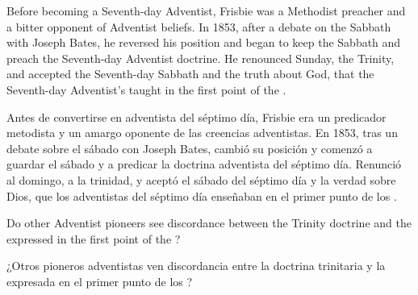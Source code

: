 Before becoming a Seventh-day Adventist, Frisbie was a Methodist preacher and a bitter opponent of Adventist beliefs. In 1853, after a debate on the Sabbath with Joseph Bates, he reversed his position and began to keep the Sabbath and preach the Seventh-day Adventist doctrine. He renounced Sunday, the Trinity, and accepted the Seventh-day Sabbath and the truth about God, that the Seventh-day Adventist’s taught in the first point of the .


Antes de convertirse en adventista del séptimo día, Frisbie era un predicador metodista y un amargo oponente de las creencias adventistas. En 1853, tras un debate sobre el sábado con Joseph Bates, cambió su posición y comenzó a guardar el sábado y a predicar la doctrina adventista del séptimo día. Renunció al domingo, a la trinidad, y aceptó el sábado del séptimo día y la verdad sobre Dios, que los adventistas del séptimo día enseñaban en el primer punto de los .


Do other Adventist pioneers see discordance between the Trinity doctrine and the  expressed in the first point of the ?


¿Otros pioneros adventistas ven discordancia entre la doctrina trinitaria y la  expresada en el primer punto de los ?





% 
